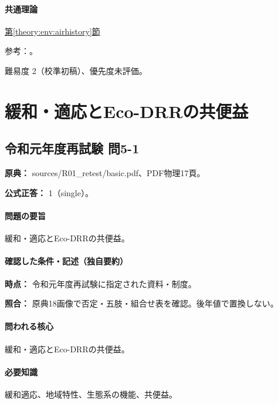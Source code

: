\paragraph{共通理論} \hyperref[theory:env:airhistory]{第\ref*{theory:env:airhistory}節}

\par 参考：\cite{env58_pm25}。

\par 難易度 2（校準初稿）、優先度未評価。

\section{緩和・適応とEco-DRRの共便益}

\subsection{令和元年度再試験 問5-1}
\label{q:r01-ret-basic-5-1}

\noindent\textbf{原典：} sources/R01\_retest/basic.pdf、PDF物理17頁。

\textbf{公式正答：} 1（single）。

\paragraph{問題の要旨} 緩和・適応とEco-DRRの共便益。

\paragraph{確認した条件・記述（独自要約）}\mbox{}\par

\noindent\textbf{時点：} 令和元年度再試験に指定された資料・制度。\par

\noindent\textbf{照合：} 原典18画像で否定・五肢・組合せ表を確認。後年値で置換しない。\par

\paragraph{問われる核心} 緩和・適応とEco-DRRの共便益。

\paragraph{必要知識} 緩和適応、地域特性、生態系の機能、共便益。

